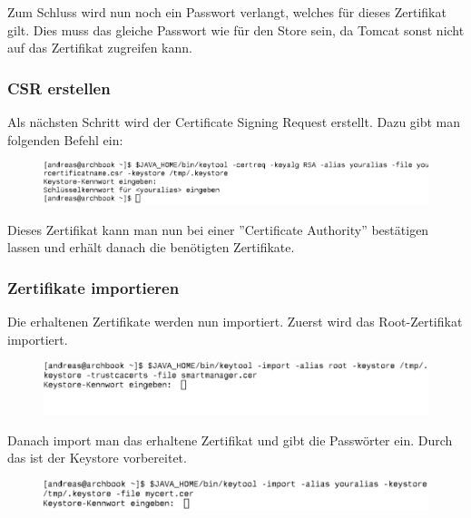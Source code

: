 Zum Schluss wird nun noch ein Passwort verlangt, welches für dieses Zertifikat gilt. Dies muss das gleiche Passwort wie für den Store sein, da Tomcat sonst nicht auf das Zertifikat zugreifen kann.

\subsubsection{CSR erstellen}
Als nächsten Schritt wird der Certificate Signing Request erstellt. Dazu gibt man folgenden Befehl ein:
\begin{figure}[H]
\centering
\includegraphics[scale=0.65]{../05_Schlussbericht/images/keystore3.png}
\end{figure}


Dieses Zertifikat kann man nun bei einer ''Certificate Authority'' bestätigen lassen und erhält danach die benötigten Zertifikate.
\subsubsection{Zertifikate importieren}
Die erhaltenen Zertifikate werden nun importiert. Zuerst wird das Root-Zertifikat importiert.
\begin{figure}[H]
\centering
\includegraphics[scale=0.65]{../05_Schlussbericht/images/keystore4.png}
\end{figure}

Danach import man das erhaltene Zertifikat und gibt die Passwörter ein. Durch das ist der Keystore vorbereitet.
\begin{figure}[H]
\centering
\includegraphics[scale=0.4]{../05_Schlussbericht/images/keystore5.png}
\end{figure}

